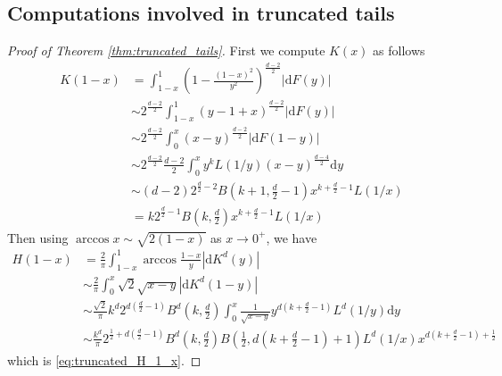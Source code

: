 \documentclass[conference,a4paper]{IEEEtran}
\def\d{\mathrm{d}}
\begin{document}
\subsection{Computations involved in truncated tails}
\begin{proof}[Proof of Theorem \ref{thm:truncated_tails}]
First we compute $K(x)$ as follows
\begin{align*}
    K(1-x)  & = \int_{1-x}^1 \left(1-\frac{(1-x)^2}{y^2}\right)^{\frac{d-2}{2}} |\d F(y)| \\
    & \sim 2^{\frac{d-2}{2}} \int_{1-x}^1 (y-1+x)^{\frac{d-2}{2}} |\d F(y)| \\
    & \sim 2^{\frac{d-2}{2}} \int_0^x (x-y)^{\frac{d-2}{2}} |\d F(1-y)| \\
    & \sim 2^{\frac{d-2}{2}} \frac{d-2}{2} \int_0^x y^k L(1/y) (x-y)^{\frac{d-4}{2}} \d y\\
    & \sim (d-2)2^{\frac{d}{2}-2} B(k+1,\frac{d}{2}-1)x^{k+\frac{d}{2}-1}L(1/x)\\
    & = k 2^{\frac{d}{2}-1} B(k, \frac{d}{2}) x^{k+\frac{d}{2}-1} L(1/x) 
\end{align*}
Then using $\arccos x \sim \sqrt{2(1-x)}$ as $x\to 0^+$,
we have
\begin{align*}
     H(1-x) & = \frac{2}{\pi} \int_{1-x}^{1}
     \arccos\frac{1-x}{y}
     |\d K^d(y)| \\
     &\sim \frac{2}{\pi}\int_0^x \sqrt{2}\sqrt{x-y} |\d K^d(1-y)| \\
     &\sim \frac{\sqrt{2}}{\pi} k^d
     2^{d(\frac{d}{2}-1)} B^d(k, \frac{d}{2})
      \int_0^x \frac{1}{\sqrt{x-y}} y^{d(k+\frac{d}{2}-1)} L^d(1/y) \d y\\
     &\sim \frac{k^d}{\pi}
     2^{\frac{1}{2} + d(\frac{d}{2}-1)} B^d(k, \frac{d}{2})
     B\left( \frac{1}{2},
     d(k+\frac{d}{2} -1)+1 \right) L^d(1/x) x^{d(k+\frac{d}{2}-1)+\frac{1}{2}}
\end{align*}
which is \eqref{eq:truncated_H_1_x}.


\end{proof}
\end{document}
